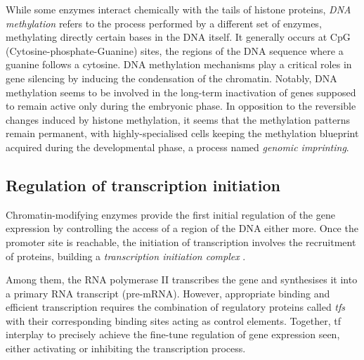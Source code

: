 While some enzymes interact chemically with the tails of histone proteins, \emph{DNA methylation} refers to the process performed by a different set of enzymes, methylating directly certain bases in the DNA itself. It generally occurs at CpG (Cytosine-phosphate-Guanine) sites, the regions of the DNA sequence where a guanine follows a cytosine. DNA methylation mechanisms play a critical roles in gene silencing by inducing the condensation of the chromatin. Notably, DNA methylation seems to be involved in the long-term inactivation of genes supposed to remain active only during the embryonic phase. In opposition to the reversible changes induced by histone methylation, it seems that the methylation patterns remain permanent, with highly-specialised cells keeping the methylation blueprint acquired during the developmental phase, a process named \emph{genomic imprinting}. 


\subsection{Regulation of transcription initiation}
\label{subsec:reg-transcript}
Chromatin-modifying enzymes provide the first initial regulation of the
gene expression by controlling the access of a region of the DNA either more. Once the promoter site is reachable, the initiation of transcription involves the recruitment of proteins, building a \emph{transcription initiation complex} .

Among them, the RNA polymerase II transcribes the gene and synthesises it into a primary RNA transcript (pre-mRNA). However, appropriate binding and efficient transcription requires the combination of regulatory proteins called \emph{\Glspl{tf}} with their corresponding binding sites acting as control elements.  Together, \acrshort{tf} interplay to precisely achieve the fine-tune regulation of gene expression seen, either activating or inhibiting the transcription process.


